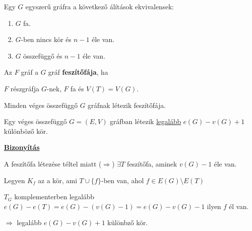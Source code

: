 \documentclass[10pt]{article}
\renewcommand{\\}{\par\noindent}
\begin{document}
\begin{frame} 
\begin{tcolorbox}[title={Tétel: Ekvivalens állítások n-pontú fákra}]
Egy $G$ egyszerű gráfra a következő álítások ekvivalensek:
\begin{enumerate}
\item $G$ fa.
\item $G$-ben nincs kör és $n - 1$ éle van.
\item $G$ összefüggő és $n - 1$ éle van.
\end{enumerate}
\end{tcolorbox}

\begin{tcolorbox}[title={Def.: Feszítőfa}]
Az $F$ gráf a $G$ gráf \textbf{feszítőfája}, ha\\
$F$ részgráfja $G$-nek, $F$ fa és $V(T) = V(G)$.
\end{tcolorbox}

\begin{tcolorbox}[title={Tétel: Feszítőfa létezése}]
Minden véges összefüggő $G$ gráfnak létezik feszítőfája.
\end{tcolorbox}

\end{frame}

\begin{frame} 
\begin{tcolorbox}[title={Tétel: Körök száma}]
Egy véges összefüggő $G = (E, V)$ gráfban létezik \underline{legalább} $e(G) - v(G) + 1$ különböző kör.\\
\tcblower
\smallskip
\underline{\textbf{Bizonyítás}}\\
\medskip
\\
A feszítőfa létezése téltel miatt ($\Rightarrow$) $\exists T$ feszítőfa, aminek $v(G) - 1$ éle van.\\
Legyen $K_f$ az a kör, ami $T \cup \{f\}$-ben van, ahol $f \in E(G) \setminus E(T)$\\
$T_G$ komplementerben legalább $e(G) - e(T) = e(G) - (v(G) - 1) = e(G) - v(G) - 1$ ilyen $f$ él van.\\
$\Rightarrow$ legalább $e(G) - v(G) + 1$ különbző kör.
\end{tcolorbox}
\end{frame}
\end{document}
